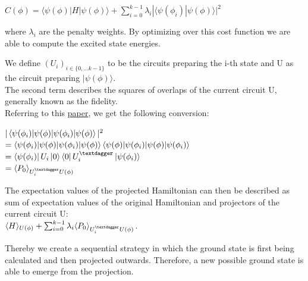 \documentclass[
  letterpaper,
  DIV=11,
  numbers=noendperiod]{scrartcl}
\begin{document}
\strut

\hfill\break
\(C(\phi) = \langle\psi(\phi)|H|\psi(\phi)\rangle + \sum_{i = 0}^{k - 1}\lambda_{i}|\langle\psi(\phi_{i})|\psi(\phi)\rangle|^{2}\)\\

\strut

\hfill\break
where \(\lambda_{i}\) are the penalty weights. By optimizing over this
cost function we are able to compute the excited state energies.

\strut

\hfill\break
We define \(\left( U_{i} \right)_{i \in \{ 0,\ldots k - 1\}}\) to be the
circuits preparing the i-th state and U as the circuit preparing
\(|\psi(\phi)\rangle\).\\
The second term describes the squares of overlaps of the current circuit
U, generally known as the fidelity.\\
Referring to this \href{https://arxiv.org/pdf/2011.05938}{paper}, we get
the following conversion:

\strut

\hfill\break
\(|\braket{\psi(\phi _{i}) | \psi(\phi)}|^2\)\\
\(= \braket{\psi(\phi _{i}) | \psi(\phi)} \braket{\psi(\phi) | \psi(\phi _{i})}\)\\
\(= \bra{\psi(\phi _{i})}U_{i}\ket{0} \bra{0}U_{i}^{\textdagger}\ket{\psi(\phi _{i})}\)\\
\(=\langle P_0\rangle_{U_{i}^{\textdagger} U(\phi)}\)

The expectation values of the projected Hamiltonian can then be
described as sum of expectation values of the original Hamiltonian and
projectors of the current circuit U:\\

\(\langle H\rangle_{U(\phi)} + \sum_{i=0}^{k-1} \lambda_{i} \langle P_0\rangle_{U_{i}^{\textdagger} U(\phi)}\).

Thereby we create a sequential strategy in which the ground state is
first being calculated and then projected outwards. Therefore, a new
possible ground state is able to emerge from the projection.
\end{document}
